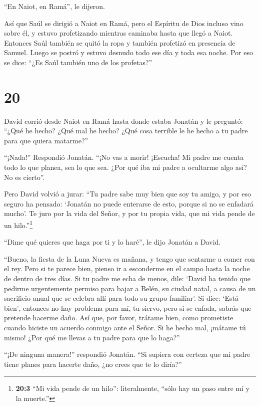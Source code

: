 ``En Naiot, en Ramá'', le dijeron.

Así que Saúl se dirigió a Naiot en Ramá, pero el Espíritu de Dios
incluso vino sobre él, y estuvo profetizando mientras caminaba hasta que
llegó a Naiot.  Entonces Saúl también se quitó la ropa y
también profetizó en presencia de Samuel. Luego se postró y estuvo
desnudo todo ese día y toda esa noche. Por eso se dice: ``¿Es Saúl
también uno de los profetas?''

\hypertarget{section-19}{%
\section{20}\label{section-19}}

 David corrió desde Naiot en Ramá hasta donde estaba Jonatán
y le preguntó: ``¿Qué he hecho? ¿Qué mal he hecho? ¿Qué cosa terrible le
he hecho a tu padre para que quiera matarme?''

 ``¡Nada!'' Respondió Jonatán. ``¡No vas a morir! ¡Escucha!
Mi padre me cuenta todo lo que planea, sea lo que sea. ¿Por qué iba mi
padre a ocultarme algo así? No es cierto''.

 Pero David volvió a jurar: ``Tu padre sabe muy bien que soy
tu amigo, y por eso seguro ha pensado: `Jonatán no puede enterarse de
esto, porque si no se enfadará mucho'. Te juro por la vida del Señor, y
por tu propia vida, que mi vida pende de un hilo.''\footnote{\textbf{20:3}
  ``Mi vida pende de un hilo'': literalmente, ``sólo hay un paso entre
  mí y la muerte.''}

 ``Dime qué quieres que haga por ti y lo haré'', le dijo
Jonatán a David.

 ``Bueno, la fiesta de la Luna Nueva es mañana, y tengo que
sentarme a comer con el rey. Pero si te parece bien, pienso ir a
esconderme en el campo hasta la noche de dentro de tres días.
 Si tu padre me echa de menos, dile: `David ha tenido que
pedirme urgentemente permiso para bajar a Belén, su ciudad natal, a
causa de un sacrificio anual que se celebra allí para todo su grupo
familiar'.  Si dice: `Está bien', entonces no hay problema
para mí, tu siervo, pero si se enfada, sabrás que pretende hacerme daño.
 Así que, por favor, trátame bien, como prometiste cuando
hiciste un acuerdo conmigo ante el Señor. Si he hecho mal, ¡mátame tú
mismo! ¿Por qué me llevas a tu padre para que lo haga?''

 ``¡De ninguna manera!'' respondió Jonatán. ``Si supiera con
certeza que mi padre tiene planes para hacerte daño, ¿no crees que te lo
diría?''

